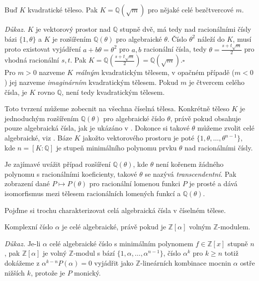 \documentclass[12pt]{report}
\begin{document}
\begin{veta}
Buď $K$ kvadratické těleso. Pak $K = \mathbb{Q}(\sqrt{m})$ pro nějaké celé bezčtvercové $m$.
\end{veta}
\noindent \textit{Důkaz.} $K$ je vektorový prostor nad $\mathbb{Q}$ stupně dvě, má tedy nad racionálními čísly bázi $\lbrace 1, \theta \rbrace$ a $K$ je rozšířením $\mathbb{Q}(\theta)$ pro algebraické $\theta$. Číslo $\theta ^2$ náleží do $K$, musí proto existovat vyjádření $a+b\theta = \theta ^2$ pro $a,b$ racionální čísla, tedy $\theta = \frac{s+t\sqrt{m}}{2}$ pro vhodná racionální $s,t$. Pak $K = \mathbb{Q}\left(\frac{s+t\sqrt{m}}{2} \right) = \mathbb{Q}(\sqrt{m})$.\hfill $\square$\\

Pro $m > 0$ nazveme $K$ \textit{reálným} kvadratickým tělesem, v opačném případě ($m < 0$) jej nazveme \textit{imaginárním} kvadratickým tělesem. Pokud $m$ je čtvercem celého čísla, je $K$ rovno $\mathbb{Q}$, není tedy kvadratickým tělesem.

Toto tvrzení můžeme zobecnit na všechna číselná tělesa. Konkrétně těleso $K$ je jednoduchým rozšířením $\mathbb{Q}(\theta)$ pro algebraické číslo $\theta$, právě pokud obsahuje pouze algebraická čísla, jak je ukázáno v \cite[Věta 11.12]{Rosicky}. Dokonce si takové $\theta$ můžeme zvolit celé algebraické, viz \cite[Lemma 4.3.8]{Perutka}. Báze $K$ jakožto vektorového prostoru je poté $\lbrace 1,\theta,\dots,\theta ^{n-1} \rbrace$, kde $n = [K : \mathbb{Q}]$ je stupeň minimálního polynomu prvku $\theta$ nad racionálními čísly. 

\begin{poznamka} 
Je zajímavé uvážit případ rozšíření $\mathbb{Q}(\theta)$, kde $\theta$ není kořenem žádného polynomu s racionálními koeficienty, takové $\theta$ se nazývá \textit{transcendentní}. Pak zobrazení dané $P \mapsto P(\theta)$ pro racionální lomenou funkci $P$ je prosté a dává isomorfismus mezi tělesem racionálních lomených funkcí a $\mathbb{Q}(\theta)$.
\end{poznamka}

Pojďme si trochu charakterizovat celá algebraická čísla v číselném tělese.

\begin{veta}\label{alg}
Komplexní číslo $\alpha$ je celé algebraické, právě pokud je $\mathbb{Z}[\alpha]$ volným $\mathbb{Z}$-modulem.
\end{veta}
\noindent \textit{Důkaz.} Je-li $\alpha$ celé algebraické číslo s minimálním polynomem $f \in \mathbb{Z}[x]$ stupně $n$, pak $\mathbb{Z}[\alpha]$ je volný $\mathbb{Z}$-modul s bází $\lbrace 1,\alpha,\dots,\alpha^{n-1} \rbrace$, číslo $\alpha^k$ pro $k\geqslant n$ totiž dokážeme z $\alpha^{k-n} P(\alpha) = 0$ vyjádřit jako $\mathbb{Z}$-lineárních kombinace mocnin $\alpha$ ostře nižších $k$, protože je $P$ monický.
\end{document}
